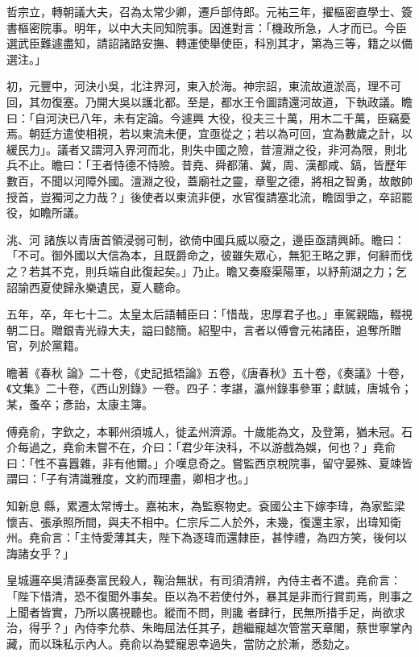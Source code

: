 \begin{pinyinscope}
 哲宗立，轉朝議大夫，召為太常少卿，遷戶部侍郎。元祐三年，擢樞密直學士、簽書樞密院事。明年，以中大夫同知院事。因進對言：「機政所急，人才而已。今臣選武臣難遽盡知，請詔諸路安撫、轉運使舉使臣，科別其才，第為三等，籍之以備選注。」



 初，元豐中，河決小吳，北注界河，東入於海。神宗詔，東流故道淤高，理不可回，其勿復塞。乃開大吳以護北都。至是，都水王令圖請還河故道，下執政議。瞻曰：「自河決已八年，未有定論。今遽興
 大役，役夫三十萬，用木二千萬，臣竊憂焉。朝廷方遣使相視，若以東流未便，宜亟從之；若以為可回，宜為數歲之計，以緩民力」。議者又謂河入界河而北，則失中國之險，昔澶淵之役，非河為限，則北兵不止。瞻曰：「王者恃德不恃險。昔堯、舜都蒲、冀，周、漢都咸、鎬，皆歷年數百，不聞以河障外國。澶淵之役，蓋廟社之靈，章聖之德，將相之智勇，故敵帥授首，豈獨河之力哉？」後使者以東流非便，水官復請塞北流，瞻固爭之，卒詔罷役，如瞻所議。



 洮、河
 諸族以青唐首領浸弱可制，欲倚中國兵威以廢之，邊臣亟請興師。瞻曰：「不可。御外國以大信為本，且既爵命之，彼雖失眾心，無犯王略之罪，何辭而伐之？若其不克，則兵端自此復起矣。」乃止。瞻又奏廢渠陽軍，以紓荊湖之力；乞詔諭西夏使歸永樂遺民，夏人聽命。



 五年，卒，年七十二。太皇太后語輔臣曰：「惜哉，忠厚君子也。」車駕親臨，輟視朝二日。贈銀青光祿大夫，謚曰懿簡。紹聖中，言者以傅會元祐諸臣，追奪所贈官，列於黨籍。



 瞻著《春秋
 論》二十卷，《史記抵牾論》五卷，《唐春秋》五十卷，《奏議》十卷，《文集》二十卷，《西山別錄》一卷。四子：孝諶，瀛州錄事參軍；獻誠，唐城令；某，蚤卒；彥詒，太康主簿。



 傅堯俞，字欽之，本鄆州須城人，徙孟州濟源。十歲能為文，及登第，猶未冠。石介每過之，堯俞未嘗不在，介曰：「君少年決科，不以游戲為娛，何也？」堯俞曰：「性不喜囂雜，非有他爾。」介嘆息奇之。嘗監西京稅院事，留守晏殊、夏竦皆謂曰：「子有清識雅度，文約而理盡，卿相才也。」



 知新息
 縣，累遷太常博士。嘉祐末，為監察物史。袞國公主下嫁李瑋，為家監梁懷吉、張承照所間，與夫不相中。仁宗斥二人於外，未幾，復還主家，出瑋知衛州。堯俞言：「主恃愛薄其夫，陛下為逐瑋而還隸臣，甚悖禮，為四方笑，後何以誨諸女乎？」



 皇城邏卒吳清誣奏富民殺人，鞠治無狀，有司須清辨，內侍主者不遣。堯俞言：「陛下惜清，恐不復聞外事矣。臣以為不若使付外，暴其是非而行賞罰焉，則事之上聞者皆實，乃所以廣視聽也。縱而不問，則讒
 者肆行，民無所措手足，尚欲求治，得乎？」內侍李允恭、朱晦屈法任其子，趙繼寵越次管當天章閣，蔡世寧掌內藏，而以珠私示內人。堯俞以為嬖寵恩幸過失，當防之於漸，悉劾之。




\end{pinyinscope}
